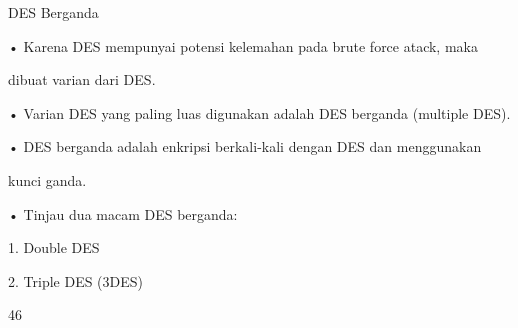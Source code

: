 \documentclass{article}
\begin{document}

DES Berganda

• Karena DES mempunyai potensi kelemahan pada brute force atack, maka 

dibuat varian dari DES.

• Varian DES yang paling luas digunakan adalah DES berganda (multiple DES).

• DES berganda adalah enkripsi berkali-kali dengan DES dan menggunakan 

kunci ganda.

• Tinjau dua macam DES berganda:

 1. Double DES

 2. Triple DES (3DES)

46
\end{document}

